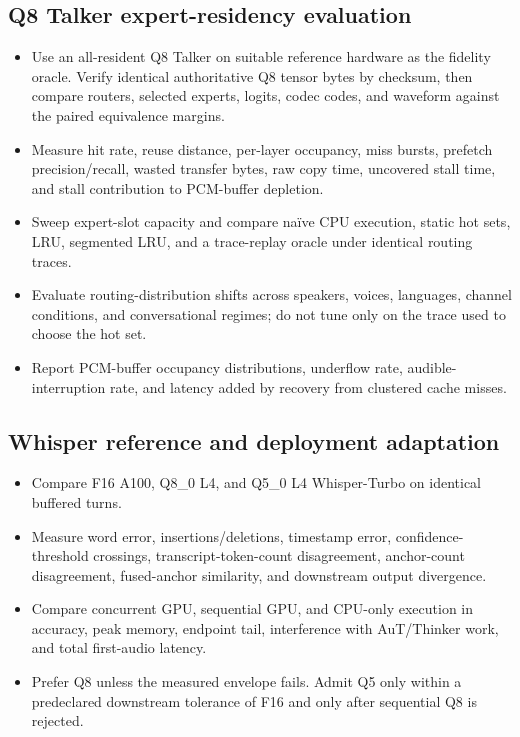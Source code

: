 \documentclass[10pt,letterpaper]{article}
\begin{document}
\subsection{Q8 Talker expert-residency evaluation}
\begin{itemize}
    \item Use an all-resident Q8 Talker on suitable reference hardware as the fidelity oracle. Verify identical authoritative Q8 tensor bytes by checksum, then compare routers, selected experts, logits, codec codes, and waveform against the paired equivalence margins.
    \item Measure hit rate, reuse distance, per-layer occupancy, miss bursts, prefetch precision/recall, wasted transfer bytes, raw copy time, uncovered stall time, and stall contribution to PCM-buffer depletion.
    \item Sweep expert-slot capacity and compare naïve CPU execution, static hot sets, LRU, segmented LRU, and a trace-replay oracle under identical routing traces.
    \item Evaluate routing-distribution shifts across speakers, voices, languages, channel conditions, and conversational regimes; do not tune only on the trace used to choose the hot set.
    \item Report PCM-buffer occupancy distributions, underflow rate, audible-interruption rate, and latency added by recovery from clustered cache misses.
\end{itemize}

\subsection{Whisper reference and deployment adaptation}
\begin{itemize}
    \item Compare F16 A100, Q8\_0 L4, and Q5\_0 L4 Whisper-Turbo on identical buffered turns.
    \item Measure word error, insertions/deletions, timestamp error, confidence-threshold crossings, transcript-token-count disagreement, anchor-count disagreement, fused-anchor similarity, and downstream output divergence.
    \item Compare concurrent GPU, sequential GPU, and CPU-only execution in accuracy, peak memory, endpoint tail, interference with AuT/Thinker work, and total first-audio latency.
    \item Prefer Q8 unless the measured envelope fails. Admit Q5 only within a predeclared downstream tolerance of F16 and only after sequential Q8 is rejected.
\end{itemize}
\end{document}
